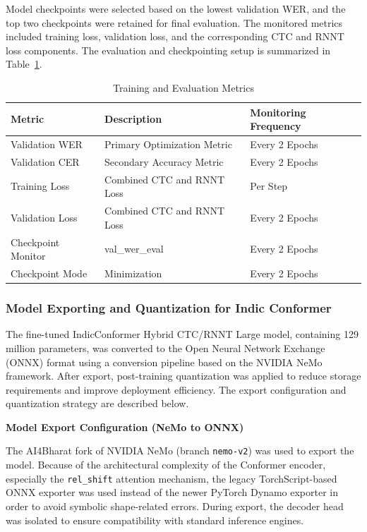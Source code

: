 Model checkpoints were selected based on the lowest validation WER, and the top two checkpoints were retained for final evaluation. The monitored metrics included training loss, validation loss, and the corresponding CTC and RNNT loss components. The evaluation and checkpointing setup is summarized in Table~\ref{tab:indic_eval}.

\begin{table}[H]
\caption{Training and Evaluation Metrics}
\label{tab:indic_eval}
\centering
\begin{tabular}{|l|l|l|}
\hline
\textbf{Metric} & \textbf{Description} & \textbf{Monitoring Frequency} \\
\hline
Validation WER & Primary Optimization Metric & Every 2 Epochs \\
Validation CER & Secondary Accuracy Metric & Every 2 Epochs \\
Training Loss & Combined CTC and RNNT Loss & Per Step \\
Validation Loss & Combined CTC and RNNT Loss & Every 2 Epochs \\
Checkpoint Monitor & val\_wer\_eval & Every 2 Epochs \\
Checkpoint Mode & Minimization & Every 2 Epochs \\
\hline
\end{tabular}
\end{table}

\subsubsection{Model Exporting and Quantization for Indic Conformer}

The fine-tuned IndicConformer Hybrid CTC/RNNT Large model, containing 129 million parameters, was converted to the Open Neural Network Exchange (ONNX) format using a conversion pipeline based on the NVIDIA NeMo framework. After export, post-training quantization was applied to reduce storage requirements and improve deployment efficiency. The export configuration and quantization strategy are described below.

\textbf{Model Export Configuration (NeMo to ONNX)}

The AI4Bharat fork of NVIDIA NeMo (branch \texttt{nemo-v2}) was used to export the model. Because of the architectural complexity of the Conformer encoder, especially the \texttt{rel\_shift} attention mechanism, the legacy TorchScript-based ONNX exporter was used instead of the newer PyTorch Dynamo exporter in order to avoid symbolic shape-related errors. During export, the decoder head was isolated to ensure compatibility with standard inference engines.

